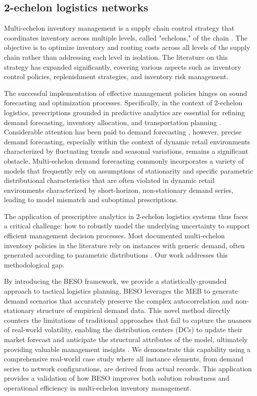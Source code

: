 \documentclass[11pt]{article}
\begin{document}
\subsection{2-echelon logistics networks}

Multi-echelon inventory management is a supply chain control strategy that coordinates inventory across multiple levels, called "echelons," of the chain \citep{Clark60}. The objective is to optimize inventory and routing costs across all levels of the supply chain rather than addressing each level in isolation. The literature on this strategy has expanded significantly, covering various aspects such as inventory control policies, replenishment strategies, and inventory risk management.

The successful implementation of effective management policies hinges on sound forecasting and optimization processes. Specifically, in the context of 2-echelon logistics, prescriptions grounded in predictive analytics are essential for refining demand forecasting, inventory allocation, and transportation planning \citep{A01}. Considerable attention has been paid to demand forecasting \citep{Ma15,Shenstone01}, however, precise demand forecasting, especially within the context of dynamic retail environments characterized by fluctuating trends and seasonal variations, remains a significant obstacle. Multi-echelon demand forecasting commonly incorporates a variety of models that frequently rely on assumptions of stationarity and specific parametric distributional characteristics that are often violated in dynamic retail environments characterized by short-horizon, non-stationary demand series, leading to model mismatch and suboptimal prescriptions.

The application of prescriptive analytics in 2-echelon logistics systems thus faces a critical challenge: how to robustly model the underlying uncertainty to support efficient management decision processes. Most documented multi-echelon inventory policies in the literature rely on instances with generic demand, often generated according to parametric distributions \citep{Escorcia20}. Our work addresses this methodological gap.

By introducing the BESO framework, we provide a statistically-grounded approach to tactical logistics planning. BESO leverages the MEB to generate demand scenarios that accurately preserve the complex autocorrelation and non-stationary structure of empirical demand data. This novel method directly counters the limitations of traditional approaches that fail to capture the nuances of real-world volatility, enabling the distribution centers (DCs) to update their market forecast and anticipate the structural attributes of the model, ultimately providing valuable management insights \citep{P16}. We demonstrate this capability using a comprehensive real-world case study where all instance elements, from demand series to network configurations, are derived from actual records. This application provides a validation of how BESO improves both solution robustness and operational efficiency in multi-echelon inventory management.
\end{document}
